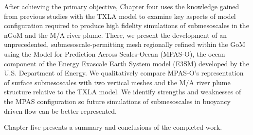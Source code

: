 After achieving the primary objective, Chapter four uses the knowledge gained from previous studies with the TXLA model to examine key aspects of model configuration required to produce high fidelity simulations of submesoscales in the nGoM and the M/A river plume. There, we present the development of an unprecedented, submesoscale-permitting mesh regionally refined within the GoM using the Model for Prediction Across Scales-Ocean (MPAS-O), the ocean component of the Energy Exascale Earth System model (E3SM) developed by the U.S. Department of Energy. We qualitatively compare MPAS-O's representation of surface submesoscales with two vertical meshes and the M/A river plume structure relative to the TXLA model. We identify strengths and weaknesses of the MPAS configuration so future simulations of submesoscales in buoyancy driven flow can be better represented. 

Chapter five presents a summary and conclusions of the completed work. 

